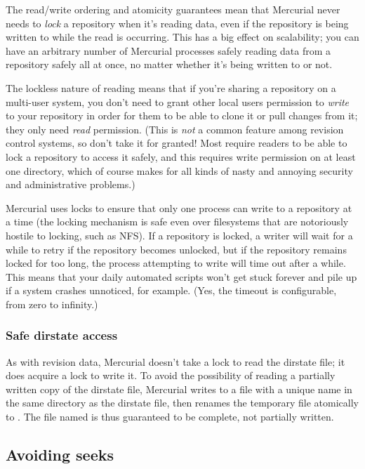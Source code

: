 The read/write ordering and atomicity guarantees mean that Mercurial
never needs to \emph{lock} a repository when it's reading data, even
if the repository is being written to while the read is occurring.
This has a big effect on scalability; you can have an arbitrary number
of Mercurial processes safely reading data from a repository safely
all at once, no matter whether it's being written to or not.

The lockless nature of reading means that if you're sharing a
repository on a multi-user system, you don't need to grant other local
users permission to \emph{write} to your repository in order for them
to be able to clone it or pull changes from it; they only need
\emph{read} permission.  (This is \emph{not} a common feature among
revision control systems, so don't take it for granted!  Most require
readers to be able to lock a repository to access it safely, and this
requires write permission on at least one directory, which of course
makes for all kinds of nasty and annoying security and administrative
problems.)

Mercurial uses locks to ensure that only one process can write to a
repository at a time (the locking mechanism is safe even over
filesystems that are notoriously hostile to locking, such as NFS).  If
a repository is locked, a writer will wait for a while to retry if the
repository becomes unlocked, but if the repository remains locked for
too long, the process attempting to write will time out after a while.
This means that your daily automated scripts won't get stuck forever
and pile up if a system crashes unnoticed, for example.  (Yes, the
timeout is configurable, from zero to infinity.)

\subsubsection{Safe dirstate access}

As with revision data, Mercurial doesn't take a lock to read the
dirstate file; it does acquire a lock to write it.  To avoid the
possibility of reading a partially written copy of the dirstate file,
Mercurial writes to a file with a unique name in the same directory as
the dirstate file, then renames the temporary file atomically to
.  The file named  is thus
guaranteed to be complete, not partially written.

\subsection{Avoiding seeks}

